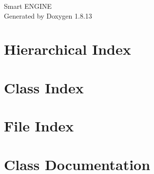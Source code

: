 \documentclass[twoside]{book}
\newcommand{\+}{\discretionary{\mbox{\scriptsize$\hookleftarrow$}}{}{}}
\newcommand{\clearemptydoublepage}{%
  \newpage{\pagestyle{empty}\cleardoublepage}%
}
\begin{document}
\hypersetup{pageanchor=false,
             bookmarksnumbered=true,
             pdfencoding=unicode
            }
\begin{titlepage}
\vspace*{7cm}
\begin{center}%
{\Large Smart E\+N\+G\+I\+NE }\\
\vspace*{1cm}
{\large Generated by Doxygen 1.8.13}\\
\end{center}
\end{titlepage}
\clearemptydoublepage
{}
\tableofcontents
\clearemptydoublepage
{}
\hypersetup{pageanchor=true}

\chapter{Hierarchical Index}

\chapter{Class Index}

\chapter{File Index}

\chapter{Class Documentation}




























\end{document}
